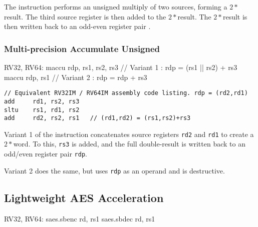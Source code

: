 The  instruction performs an unsigned multiply
of two \XLEN sources, forming a $2*$\XLEN result.
The third \XLEN source register is then added to the $2*$\XLEN result.
The $2*$\XLEN result is then written back to an odd-even register
pair \rdp.


\subsubsection{Multi-precision Accumulate Unsigned}

\begin{cryptoisa}
RV32, RV64:
    maccu   rdp, rs1, rs2, rs3  // Variant 1 : rdp = (rs1 || rs2) + rs3
    maccu   rdp, rs1            // Variant 2 : rdp =  rdp         + rs3
\end{cryptoisa}

\begin{lstlisting}[]
// Equivalent RV32IM / RV64IM assembly code listing. rdp = (rd2,rd1)
add     rd1, rs2, rs3
sltu    rs1, rd1, rs2
add     rd2, rs2, rs1   // (rd1,rd2) = (rs1,rs2)+rs3
\end{lstlisting}

Variant 1 of the  instruction
concatenates source registers
{\tt rd2}
and
{\tt rd1}
to create a $2*$\XLEN word.
To this,
{\tt rs3} is added,
and the full double-\XLEN result is written back to
an odd/even register pair {\tt rdp}.

Variant 2 does the same, but uses {\tt rdp} as an operand and is
destructive.



\subsection{Lightweight AES Acceleration}

\begin{cryptoisa}
RV32, RV64:
    saes.sbenc rd, rs1
    saes.sbdec rd, rs1
\end{cryptoisa}

